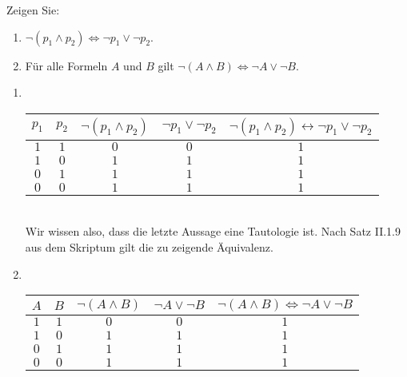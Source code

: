 
\begin{exercise}[18]

Zeigen Sie:

\begin{enumerate}[label = \alph*]
    \item $\neg (p_1 \land p_2) \Leftrightarrow \neg p_1 \lor \neg p_2$.
    \item Für alle Formeln $A$ und $B$ gilt $\neg (A \land B) \Leftrightarrow \neg A \lor \neg B$.
\end{enumerate}

\end{exercise}


\begin{solution}

\phantom{}

\begin{enumerate}[label = \alph*]

    \item \phantom{} \\

    \begin{tabular}{|c|c|c|c|c|}
        \hline
        $p_1$ & $p_2$ & $\neg (p_1 \land p_2)$ & $\neg p_1 \lor \neg p_2$ & $\neg (p_1 \land p_2) \leftrightarrow \neg p_1 \lor \neg p_2$ \\
        \hline
        $1$ & $1$ & $0$ & $0$ & $1$\\
        \hline
        $1$ & $0$ & $1$ & $1$ & $1$\\
        \hline
        $0$ & $1$ & $1$ & $1$ & $1$\\
        \hline
        $0$ & $0$ & $1$ & $1$ & $1$\\
        \hline
    \end{tabular} \\

    Wir wissen also, dass die letzte Aussage eine Tautologie ist.
    Nach Satz II.1.9 aus dem Skriptum gilt die zu zeigende Äquivalenz.

    \item \phantom{} \\
    
    \begin{tabular}{|c|c|c|c|c|}
        \hline
        $A$ & $B$ & $\neg (A \land B)$ & $\neg A \lor \neg B$ & $\neg (A \land B) \Leftrightarrow \neg A \lor \neg B$ \\
        \hline
        $1$ & $1$ & $0$ & $0$ & $1$\\
        \hline
        $1$ & $0$ & $1$ & $1$ & $1$\\
        \hline
        $0$ & $1$ & $1$ & $1$ & $1$\\
        \hline
        $0$ & $0$ & $1$ & $1$ & $1$\\
        \hline
    \end{tabular}        

\end{enumerate}

\end{solution}

